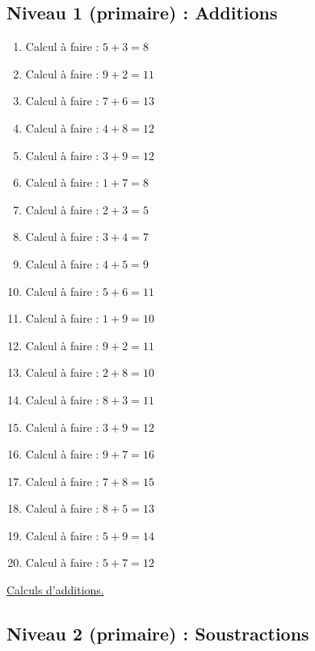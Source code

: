 \documentclass[11pt]{article}
\begin{document}
\subsection{Niveau 1 (primaire) : Additions}
\label{sec:org5a974e6}
\label{org9ea4aca}



\begin{enumerate}
\item Calcul à faire :  \(5 + 3 = 8\)
\item Calcul à faire :  \(9 + 2 = 11\)
\item Calcul à faire :  \(7 + 6 = 13\)
\item Calcul à faire :  \(4 + 8 = 12\)
\item Calcul à faire :  \(3 + 9 = 12\)
\item Calcul à faire :  \(1 + 7 = 8\)
\item Calcul à faire :  \(2 + 3 = 5\)
\item Calcul à faire :  \(3 + 4 = 7\)
\item Calcul à faire :  \(4 + 5 = 9\)
\item Calcul à faire :  \(5 + 6 = 11\)
\item Calcul à faire :  \(1 + 9 = 10\)
\item Calcul à faire :  \(9 + 2 = 11\)
\item Calcul à faire :  \(2 + 8 = 10\)
\item Calcul à faire :  \(8 + 3 = 11\)
\item Calcul à faire :  \(3 + 9 = 12\)
\item Calcul à faire :  \(9 + 7 = 16\)
\item Calcul à faire :  \(7 + 8 = 15\)
\item Calcul à faire :  \(8 + 5 = 13\)
\item Calcul à faire :  \(5 + 9 = 14\)
\item Calcul à faire :  \(5 + 7 = 12\)
\end{enumerate}




\hyperref[org3b22036]{Calculs d'additions.}



\newpage

\subsection{Niveau 2 (primaire) : Soustractions}
\label{sec:orgf65d57b}
\label{orgaa3e8ef}
\end{document}
